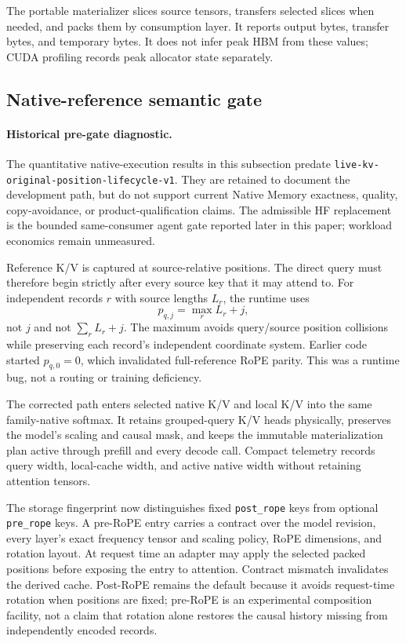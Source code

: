 \documentclass[11pt]{article}
\newcommand{\EngineContract}{\texttt{live-kv-original-\allowbreak position-\allowbreak lifecycle-v1}}
\begin{document}
The portable materializer slices source tensors, transfers selected slices when
needed, and packs them by consumption layer.  It reports output bytes, transfer
bytes, and temporary bytes.  It does not infer peak HBM from these values; CUDA
profiling records peak allocator state separately.

\subsection{Native-reference semantic gate}

\paragraph{Historical pre-gate diagnostic.}
The quantitative native-execution results in this subsection predate
\EngineContract{}. They are retained to document
the development path, but do not support current Native Memory exactness,
quality, copy-avoidance, or product-qualification claims. The admissible HF
replacement is the bounded same-consumer agent gate reported later in this
paper; workload economics remain unmeasured.

Reference K/V is captured at source-relative positions. The direct query must
therefore begin strictly after every source key that it may attend to. For
independent records $r$ with source lengths $L_r$, the runtime uses
\begin{equation}
p_{q,j}=\max_r L_r+j,
\end{equation}
not $j$ and not $\sum_r L_r+j$. The maximum avoids query/source position
collisions while preserving each record's independent coordinate system.
Earlier code started $p_{q,0}=0$, which invalidated full-reference RoPE parity.
This was a runtime bug, not a routing or training deficiency.

The corrected path enters selected native K/V and local K/V into the same
family-native softmax. It retains grouped-query K/V heads physically, preserves
the model's scaling and causal mask, and keeps the immutable materialization
plan active through prefill and every decode call. Compact telemetry records
query width, local-cache width, and active native width without retaining
attention tensors.

The storage fingerprint now distinguishes fixed \texttt{post\_rope} keys from
optional \texttt{pre\_rope} keys. A pre-RoPE entry carries a contract over the
model revision, every layer's exact frequency tensor and scaling policy, RoPE
dimensions, and rotation layout. At request time an adapter may apply the
selected packed positions before exposing the entry to attention. Contract
mismatch invalidates the derived cache. Post-RoPE remains the default because
it avoids request-time rotation when positions are fixed; pre-RoPE is an
experimental composition facility, not a claim that rotation alone restores
the causal history missing from independently encoded records.
\end{document}
